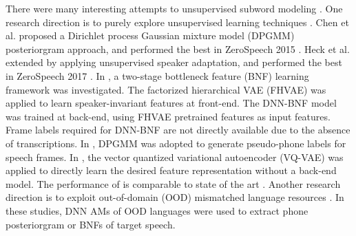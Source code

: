 \documentclass[a4paper]{article}
\begin{document}
There were many {\color{blue}interesting attempts} to unsupervised subword modeling \cite{chen2015parallel,heck2017feature,chorowski2019unsupervised,shibata2017composite,feng2019_TASLP,riviere2020unsupervised,Feng2019combining}. One research direction is to purely explore unsupervised learning techniques 
\cite{chen2015parallel,heck2017feature,chorowski2019unsupervised}. Chen et al. \cite{chen2015parallel} proposed a   Dirichlet process Gaussian mixture model (DPGMM)   posteriorgram approach, and  performed the best in ZeroSpeech 2015 \cite{versteegh2015zero}. Heck et al. \cite{heck2017feature} extended \cite{chen2015parallel} by applying unsupervised speaker adaptation, and performed the best in ZeroSpeech 2017 \cite{heck2017feature}. 
{\color{blue}
In \cite{Feng2019improving}, a two-stage bottleneck feature (BNF) learning framework was investigated. The factorized hierarchical VAE (FHVAE) \cite{hsu2017nips} was applied to learn speaker-invariant features at front-end. The DNN-BNF model \cite{chen2017multilingual} was trained at back-end, using FHVAE pretrained features as input features. Frame labels required for DNN-BNF
are not directly available due to the absence of transcriptions. In \cite{Feng2019improving},
 DPGMM was adopted to generate pseudo-phone labels for speech frames.}
In  \cite{chorowski2019unsupervised}, the vector quantized variational autoencoder (VQ-VAE) \cite{oord2017neural} was applied to directly learn the desired feature representation without a back-end model. 
The performance of \cite{chorowski2019unsupervised} is comparable to state of the art \cite{heck2017feature}.
Another research direction is to exploit  out-of-domain (OOD) mismatched language resources
\cite{feng2019_TASLP,shibata2017composite}. In these studies, {\color{blue} DNN AMs of } OOD languages were used to extract   phone posteriorgram or BNFs of target speech. 
\end{document}
